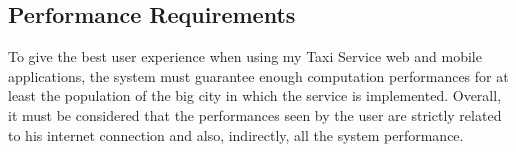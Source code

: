 \subsection{Performance Requirements}
To give the best user experience when using my Taxi Service web and mobile applications, the system must guarantee enough computation performances for at least the population of the big city in which the service is implemented.
Overall, it must be considered that the performances seen by the user are strictly related to his internet connection and also, indirectly, all the system performance.